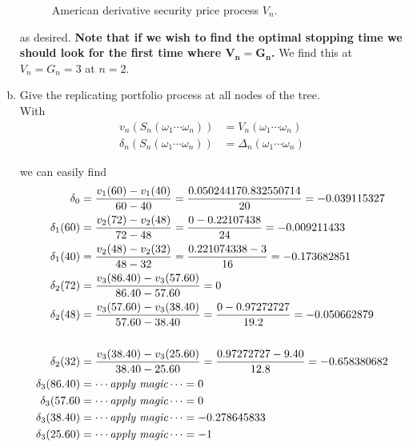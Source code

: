\documentclass[12pt]{article}
\begin{document}
\begin{enumerate}[(a)]
\begin{figure}[H]
	\caption{American derivative security price process $V_n$.}
	\end{figure}
	
	as desired. {\bf Note that if we wish to find the optimal stopping time we should look for the first time where $\bm{V_n = G_n}$.} We find this at $V_n = G_n = 3$ at $n = 2$.
	
	\item Give the replicating portfolio process at all nodes of the tree. \\
	
	With 
	\begin{align*}
		v_n(S_n(\omega_1 \cdots \omega_n)) &= V_n(\omega_1\cdots\omega_n) \\
		\delta_n(S_n(\omega_1\cdots\omega_n)) &= \Delta_n(\omega_1\cdots\omega_n) 
	\end{align*}
	
	we can easily find
	\begin{align*}
		\delta_0 &= \frac{v_1(60) - v_1(40)}{60 - 40} = \frac{ 0.05024417   0.832550714 }{ 20 } = -0.039115327 \\
		\delta_1(60) &= \frac{ v_2(72) - v_2(48) }{72 - 48} = \frac{ 0 - 0.22107438 }{24} = -0.009211433 \\
		\delta_1(40) &= \frac{ v_2(48) - v_2(32) }{48 - 32} = \frac{0.221074338 - 3}{16} = -0.173682851 \\
		\delta_2(72) &= \frac{ v_3(86.40) - v_3(57.60) }{ 86.40 - 57.60 } = 0 \\
		\delta_2(48) &= \frac{ v_3(57.60) - v_3(38.40) }{ 57.60 - 38.40 } = \frac{0 - 0.97272727 }{ 19.2 } = -0.050662879 \\ \\
		\delta_2(32) &= \frac{ v_3(38.40) - v_3(25.60) }{ 38.40 - 25.60 } = \frac{ 0.97272727 - 9.40 }{ 12.8 } = -0.658380682 \\
		\delta_3(86.40) &= \cdots \text{{\em apply magic}} \cdots = 0 \\
		\delta_3(57.60 &= \cdots \text{{\em apply magic}} \cdots = 0 \\
		\delta_3(38.40) &= \cdots \text{{\em apply magic}} \cdots  = -0.278645833 \\
		\delta_3(25.60) &= \cdots \text{{\em apply magic}} \cdots = -1
	\end{align*}
	

\end{enumerate}
\end{document}
